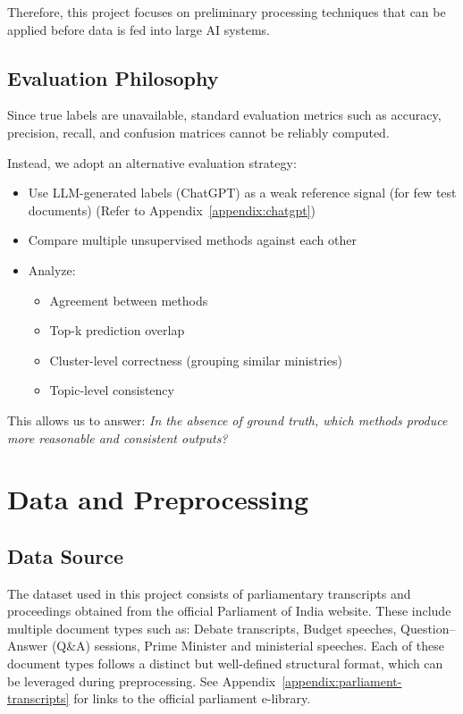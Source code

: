 \documentclass{report}
\begin{document}
Therefore, this project focuses on preliminary processing techniques that can be applied before data is fed into large AI systems.

\subsection{Evaluation Philosophy}
Since true labels are unavailable, standard evaluation metrics such as accuracy, precision, recall, and confusion matrices cannot be reliably computed.

Instead, we adopt an alternative evaluation strategy:
\begin{itemize}
    \item Use LLM-generated labels (ChatGPT) as a weak reference signal (for few test documents) (Refer to Appendix~\ref{appendix:chatgpt})
    \item Compare multiple unsupervised methods against each other
    \item Analyze:
        \begin{itemize}
            \item Agreement between methods
            \item Top-k prediction overlap
            \item Cluster-level correctness (grouping similar ministries)
            \item Topic-level consistency
        \end{itemize}
\end{itemize}

This allows us to answer: \textit{In the absence of ground truth, which methods produce more reasonable and consistent outputs?}

\section{Data and Preprocessing}
\subsection{Data Source}
The dataset used in this project consists of parliamentary transcripts and proceedings obtained from the official Parliament of India website. These include multiple document types such as: Debate transcripts, Budget speeches, Question–Answer (Q\&A) sessions, Prime Minister and ministerial speeches. Each of these document types follows a distinct but well-defined structural format, which can be leveraged during preprocessing. See Appendix~\ref{appendix:parliament-transcripts} for links to the official parliament e-library.
\end{document}

